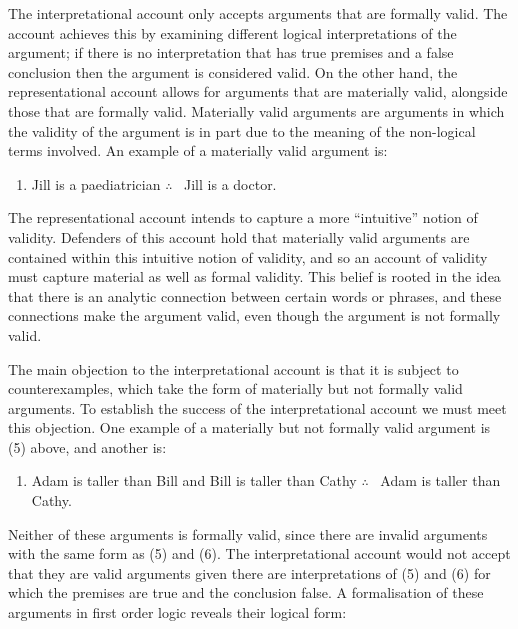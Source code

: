 The interpretational account only accepts arguments that are formally
valid. The account achieves this by examining different logical
interpretations of the argument; if there is no interpretation that has
true premises and a false conclusion then the argument is considered
valid. On the other hand, the representational account allows for
arguments that are materially valid, alongside those that are formally
valid. Materially valid arguments are arguments in which the validity of
the argument is in part due to the meaning of the non-logical terms
involved. An example of a materially valid argument is:

\begin{enumerate}[leftmargin=42] 
\def\labelenumi{(\arabic{enumi})}
\setcounter{enumi}{4}
\item
  Jill is a paediatrician $\therefore$ \ Jill is a doctor.
\end{enumerate}

\noindent The representational account intends to capture a more ``intuitive''
notion of validity. Defenders of this account hold that materially valid
arguments are contained within this intuitive notion of validity, and so
an account of validity must capture material as well as formal validity.
This belief is rooted in the idea that there is an analytic connection
between certain words or phrases, and these connections make the
argument valid, even though the argument is not formally valid.

The main objection to the interpretational account is that it is subject
to counterexamples, which take the form of materially but not formally
valid arguments. To establish the success of the interpretational
account we must meet this objection. One example of a materially but not
formally valid argument is (5) above, and another is:

\begin{enumerate}[leftmargin=42] 
\def\labelenumi{(\arabic{enumi})}
\setcounter{enumi}{5}
\item
  Adam is taller than Bill and Bill is taller than Cathy $\therefore$ \ Adam is
taller than Cathy. 
\end{enumerate}

\noindent Neither of these arguments is formally valid, since there are invalid
arguments with the same form as (5) and (6). The interpretational
account would not accept that they are valid arguments given there are
interpretations of (5) and (6) for which the premises are true and the
conclusion false. A formalisation of these arguments in first order
logic reveals their logical form:

